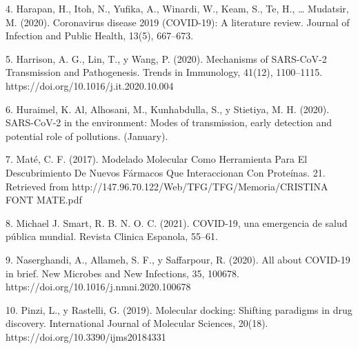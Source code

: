 \documentclass[12pt]{article}
\begin{document}
4.	Harapan, H., Itoh, N., Yufika, A., Winardi, W., Keam, S., Te, H., … Mudatsir, M. (2020). Coronavirus disease 2019 (COVID-19): A literature review. Journal of Infection and Public Health, 13(5), 667–673.

5.	Harrison, A. G., Lin, T., y Wang, P. (2020). Mechanisms of SARS-CoV-2 Transmission and Pathogenesis. Trends in Immunology, 41(12), 1100–1115. https://doi.org/10.1016/j.it.2020.10.004

6.	Huraimel, K. Al, Alhosani, M., Kunhabdulla, S., y Stietiya, M. H. (2020). SARS-CoV-2 in the environment: Modes of transmission, early detection and potential role of pollutions. (January).

7.	Maté, C. F. (2017). Modelado Molecular Como Herramienta Para El Descubrimiento De Nuevos Fármacos Que Interaccionan Con Proteínas. 21. Retrieved from http://147.96.70.122/Web/TFG/TFG/Memoria/CRISTINA FONT MATE.pdf

8.	Michael J. Smart, R. B. N. O. C. (2021). COVID-19, una emergencia de salud pública mundial. Revista Clinica Espanola, 55–61.

9.	Naserghandi, A., Allameh, S. F., y Saffarpour, R. (2020). All about COVID-19 in brief. New Microbes and New Infections, 35, 100678. https://doi.org/10.1016/j.nmni.2020.100678

10.	Pinzi, L., y Rastelli, G. (2019). Molecular docking: Shifting paradigms in drug discovery. International Journal of Molecular Sciences, 20(18). https://doi.org/10.3390/ijms20184331
\end{document}
